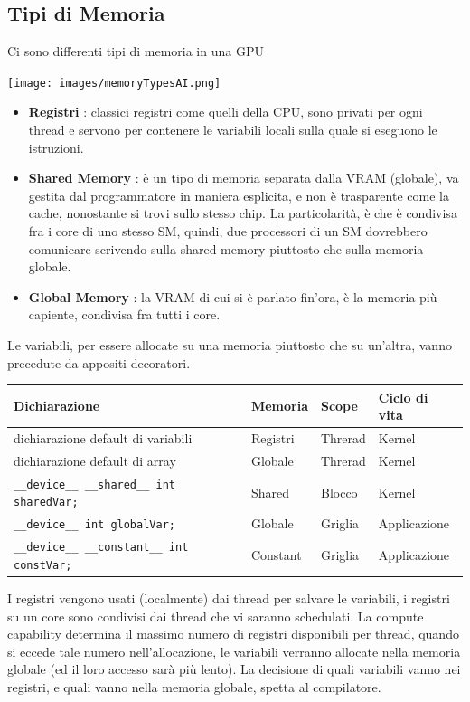 \documentclass[10pt, letterpaper]{report}
\begin{document}
\subsection{Tipi di Memoria}
Ci sono differenti tipi di memoria in una GPU\begin{center}
    \texttt{[image: images/memoryTypesAI.png]}
\end{center}
\begin{itemize}
    \item \textbf{Registri} : classici registri come quelli della CPU, sono privati per ogni thread e servono per contenere le variabili locali sulla quale si eseguono le istruzioni. 
    \item \textbf{Shared Memory} : è un tipo di memoria separata dalla VRAM (globale), va gestita dal programmatore in maniera esplicita, e non è trasparente come la cache, nonostante si trovi sullo stesso chip. La particolarità, è che è condivisa fra i core di uno stesso SM, quindi, due processori di un SM dovrebbero comunicare scrivendo sulla shared memory piuttosto che sulla memoria globale. 
    \item \textbf{Global Memory} : la VRAM di cui si è parlato fin'ora, è la memoria più capiente, condivisa fra tutti i core.
\end{itemize}
Le variabili, per essere allocate su una memoria piuttosto che su un'altra, vanno precedute da appositi decoratori.\begin{center}
    \begin{tabular}{|l|l|l|l|}
        \hline
        \rowcolor[HTML]{C0C0C0} 
        \textbf{Dichiarazione}                                 & \textbf{Memoria} & \textbf{Scope} & \textbf{Ciclo di vita} \\ \hline
        dichiarazione default di variabili                     & Registri         & Threrad        & Kernel                 \\ \hline
        dichiarazione default di array                         & Globale          & Threrad        & Kernel                 \\ \hline
        \texttt{\_\_device\_\_ \_\_shared\_\_ int sharedVar;}  & Shared           & Blocco         & Kernel                 \\ \hline
        \texttt{\_\_device\_\_ int globalVar;}                 & Globale          & Griglia        & Applicazione           \\ \hline
        \texttt{\_\_device\_\_ \_\_constant\_\_ int constVar;} & Constant         & Griglia        & Applicazione           \\ \hline
        \end{tabular}    
\end{center}
I registri vengono usati (localmente) dai thread per salvare le variabili, i registri su un core sono condivisi dai thread che vi saranno schedulati. La compute capability determina il massimo numero di registri disponibili per thread, quando si eccede tale numero nell'allocazione, le variabili verranno allocate nella memoria globale (ed il loro accesso sarà più lento). La decisione di quali variabili vanno nei registri, e quali vanno nella memoria globale, spetta al compilatore.
\end{document}
